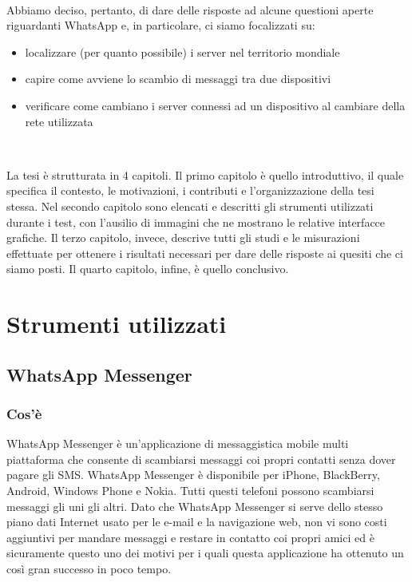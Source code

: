 \documentclass[a4paper,11pt]{book}
\begin{document}
~

Abbiamo deciso, pertanto, di dare delle risposte ad alcune questioni aperte riguardanti WhatsApp e, in particolare, ci siamo focalizzati su:
\begin{itemize}
 \item localizzare (per quanto possibile) i server nel territorio mondiale
 \item capire come avviene lo scambio di messaggi tra due dispositivi
 \item verificare come cambiano i server connessi ad un dispositivo al cambiare della rete utilizzata
\end{itemize}

~

La tesi \`e strutturata in 4 capitoli.
Il primo capitolo \`e quello introduttivo, il quale specifica il contesto, le motivazioni, i contributi e l'organizzazione della tesi stessa.
Nel secondo capitolo sono elencati e descritti gli strumenti utilizzati durante i test, con l'ausilio di immagini che ne mostrano le relative interfacce grafiche. 
Il terzo capitolo, invece, descrive tutti gli studi e le misurazioni effettuate per ottenere i risultati necessari per dare delle risposte ai quesiti che ci siamo posti.
Il quarto capitolo, infine, \`e quello conclusivo.

\chapter{Strumenti utilizzati}

\section{WhatsApp Messenger}
\subsection{Cos'\`e}
WhatsApp Messenger \`e un'applicazione di messaggistica mobile multi piattaforma che consente di scambiarsi messaggi coi propri contatti senza dover pagare gli SMS. WhatsApp Messenger \`e disponibile per iPhone, BlackBerry, Android, Windows Phone e Nokia. Tutti questi telefoni possono scambiarsi messaggi gli uni gli altri. Dato che WhatsApp Messenger si serve dello stesso piano dati Internet usato per le e-mail e la navigazione web, non vi sono costi aggiuntivi per mandare messaggi e restare in contatto coi propri amici ed \`e sicuramente questo uno dei motivi per i quali questa applicazione ha ottenuto un cos\`i gran successo in poco tempo.
\end{document}
